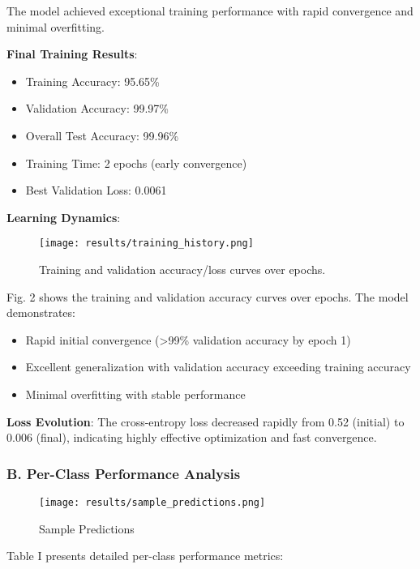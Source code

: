 \documentclass[11pt,a4paper,twoside]{article}
\providecommand{\tightlist}{%
  \setlength{\itemsep}{0pt}\setlength{\parskip}{0pt}}
\begin{document}
The model achieved exceptional training performance with rapid
convergence and minimal overfitting.

\textbf{Final Training Results}:

\begin{itemize}
\tightlist
\item
  Training Accuracy: 95.65\%
\item
  Validation Accuracy: 99.97\%
\item
  Overall Test Accuracy: 99.96\%
\item
  Training Time: 2 epochs (early convergence)
\item
  Best Validation Loss: 0.0061
\end{itemize}

\textbf{Learning Dynamics}:
\begin{figure}[H]
    \centering
    \texttt{[image: results/training\_history.png]}
    \caption{Training and validation accuracy/loss curves over epochs.}
    \label{fig:training_history}
\end{figure}

Fig. 2 shows the training and validation accuracy curves over epochs.
The model demonstrates:

\begin{itemize}
\tightlist
\item
  Rapid initial convergence (\textgreater99\% validation accuracy by
  epoch 1)
\item
  Excellent generalization with validation accuracy exceeding training
  accuracy
\item
  Minimal overfitting with stable performance
\end{itemize}

\textbf{Loss Evolution}: The cross-entropy loss decreased rapidly from
0.52 (initial) to 0.006 (final), indicating highly effective
optimization and fast convergence.

\subsubsection{B. Per-Class Performance
Analysis}\label{b.-per-class-performance-analysis}

\begin{figure}
\centering
\texttt{[image: results/sample\_predictions.png]}
\caption{Sample Predictions}
\end{figure}

Table I presents detailed per-class performance metrics:
\end{document}
